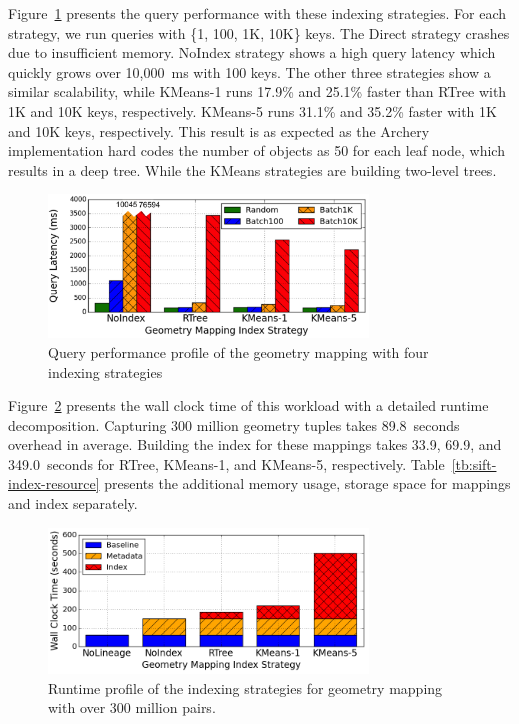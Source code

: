 \documentclass{sig-alternate}
\begin{document}
Figure~\ref{fig:sift-query} presents the query performance with these indexing strategies.
For each strategy, we run queries with \{1, 100, 1K, 10K\} keys.
The Direct strategy crashes due to insufficient memory.
NoIndex strategy shows a high query latency which quickly grows over 10,000~ms with 100 keys.
The other three strategies show a similar scalability, while KMeans-1 runs 17.9\% and 25.1\% faster than RTree with 1K and 10K keys, respectively.
KMeans-5 runs  31.1\% and 35.2\% faster with 1K and 10K keys, respectively.
This result is as expected as the Archery implementation hard codes the number of objects as 50 for each leaf node, which results in a deep tree.
While the KMeans strategies are building two-level trees.

\begin{figure}[t]
\begin{center}
    \includegraphics[width=85mm]{pictures/SIFTQuery-Time-tuned}
\caption {Query performance profile of the geometry mapping with four indexing strategies
    \label{fig:sift-query}
}
\end{center}
\end{figure}

Figure~\ref{fig:sift-time} presents the wall clock time of this workload with a detailed runtime decomposition. 
Capturing 300 million geometry tuples takes 89.8~seconds overhead in average. 
Building the index for these mappings takes 33.9, 69.9, and 349.0~seconds for RTree, KMeans-1, and KMeans-5, respectively.
Table~\ref{tb:sift-index-resource} presents the additional memory usage, storage space for mappings and
index separately.

\begin{figure}[t]
\begin{center}
    \includegraphics[width=85mm]{pictures/SIFTIndex-Time}
\caption {Runtime profile of the indexing strategies for geometry mapping with over 300 million pairs.
    \label{fig:sift-time}
}
\end{center}
\end{figure}
\end{document}
